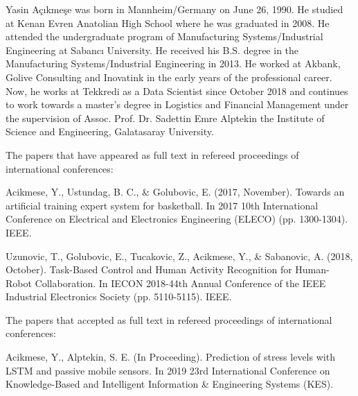 \curriculumvitae
Yasin Açıkmeşe was born in Mannheim/Germany on June 26, 1990. He studied at Kenan Evren Anatolian High School where he was graduated in 2008. He attended the undergraduate program of Manufacturing Systems/Industrial Engineering at Sabancı University. He received his B.S. degree in the Manufacturing Systems/Industrial Engineering in 2013. He worked at Akbank, Golive Consulting and Inovatink in the early years of the professional career. Now, he works at Tekkredi as a Data Scientist since October 2018 and continues to work towards a master’s degree in Logistics and Financial Management under the supervision of Assoc. Prof. Dr. Sadettin Emre Alptekin the Institute of Science and Engineering, Galatasaray University.

The papers that have appeared as full text in refereed proceedings of international conferences:

Acikmese, Y., Ustundag, B. C., & Golubovic, E. (2017, November). Towards an artificial training expert system for basketball. In 2017 10th International Conference on Electrical and Electronics Engineering (ELECO) (pp. 1300-1304). IEEE.

Uzunovic, T., Golubovic, E., Tucakovic, Z., Acikmese, Y., & Sabanovic, A. (2018, October). Task-Based Control and Human Activity Recognition for Human-Robot Collaboration. In IECON 2018-44th Annual Conference of the IEEE Industrial Electronics Society (pp. 5110-5115). IEEE.

The papers that accepted as full text in refereed proceedings of international conferences:

Acikmese, Y., Alptekin, S. E. (In Proceeding). Prediction of stress levels with LSTM and passive mobile sensors. In 2019 23rd International Conference on Knowledge-Based and Intelligent Information & Engineering
Systems (KES).

\label{chapter:vita}